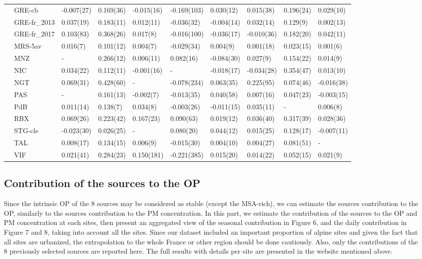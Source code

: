 \documentclass[
]{article}
\begin{document}
\begin{longtable}[]{@{}llllllllll@{}}
& GRE-cb & -0.007(27) & 0.169(36) & -0.015(16) & -0.169(103) & 0.030(12)
& 0.015(38) & 0.196(24) & 0.029(10)\tabularnewline
& GRE-fr\_2013 & 0.037(19) & 0.183(11) & 0.012(11) & -0.036(32) &
-0.004(14) & 0.032(14) & 0.129(9) & 0.002(13)\tabularnewline
& GRE-fr\_2017 & 0.103(83) & 0.368(26) & 0.017(8) & -0.016(100) &
-0.036(17) & -0.010(36) & 0.182(20) & 0.042(11)\tabularnewline
& MRS-5av & 0.016(7) & 0.101(12) & 0.004(7) & -0.029(34) & 0.004(9) &
0.001(18) & 0.023(15) & 0.001(6)\tabularnewline
& MNZ & - & 0.266(12) & 0.006(11) & 0.082(16) & -0.084(30) & 0.027(9) &
0.154(22) & 0.014(9)\tabularnewline
& NIC & 0.034(22) & 0.112(11) & -0.001(16) & - & -0.018(17) & -0.034(28)
& 0.354(47) & 0.013(10)\tabularnewline
& NGT & 0.069(31) & 0.428(60) & - & -0.078(234) & 0.063(35) & 0.225(95)
& 0.074(46) & -0.016(38)\tabularnewline
& PAS & - & 0.161(13) & -0.002(7) & -0.013(35) & 0.040(58) & 0.007(16) &
0.047(23) & -0.003(15)\tabularnewline
& PdB & 0.011(14) & 0.138(7) & 0.034(8) & -0.003(26) & -0.011(15) &
0.035(11) & - & 0.006(8)\tabularnewline
& RBX & 0.069(26) & 0.223(42) & 0.167(23) & 0.090(63) & 0.019(12) &
0.036(40) & 0.317(39) & 0.028(36)\tabularnewline
& STG-cle & -0.023(30) & 0.026(25) & - & 0.080(20) & 0.044(12) &
0.015(25) & 0.128(17) & -0.007(11)\tabularnewline
& TAL & 0.008(17) & 0.134(15) & 0.006(9) & -0.015(30) & 0.004(10) &
0.004(27) & 0.081(51) & -\tabularnewline
& VIF & 0.021(41) & 0.284(23) & 0.150(181) & -0.221(385) & 0.015(20) &
0.014(22) & 0.052(15) & 0.021(9)\tabularnewline
\bottomrule
\end{longtable}

\hypertarget{contribution-of-the-sources-to-the-op-1}{%
\subsection{Contribution of the sources to the
OP}\label{contribution-of-the-sources-to-the-op-1}}

Since the intrinsic OP of the 8 sources may be considered as stable
(except the MSA-rich), we can estimate the sources contribution to the
OP, similarly to the sources contribution to the PM concentration. In
this part, we estimate the contribution of the sources to the OP and PM
concentration at each sites, then present an aggregated view of the
seasonal contribution in Figure 6, and the daily contribution in Figure
7 and 8, taking into account all the sites. Since our dataset included
an important proportion of alpine sites and given the fact that all
sites are urbanized, the extrapolation to the whole France or other
region should be done cautiously. Also, only the contributions of the 8
previously selected sources are reported here. The full results with
details per site are presented in the website mentioned above.
\end{document}
